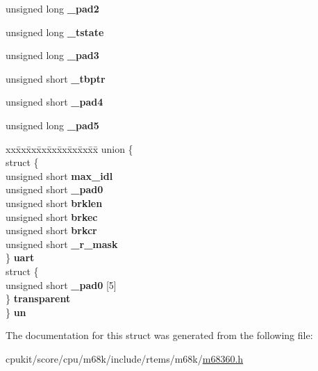 \begin{DoxyCompactItemize}
\mbox{\label{structm360SMCparms___a5f11a155ff3ae2e140478bc896fb7c73}} 
unsigned long {\bfseries \+\_\+pad2}
\item 
\mbox{\label{structm360SMCparms___a14de9c88df7ce54bcdd005c7e20d6cac}} 
unsigned long {\bfseries \+\_\+tstate}
\item 
\mbox{\label{structm360SMCparms___ad1c50a2648813585cfe1d586f0d2aab8}} 
unsigned long {\bfseries \+\_\+pad3}
\item 
\mbox{\label{structm360SMCparms___aca7fd379aaa1236a2b74e1fa799dba6d}} 
unsigned short {\bfseries \+\_\+tbptr}
\item 
\mbox{\label{structm360SMCparms___a2435a2ede810d0e026f723d1068fd534}} 
unsigned short {\bfseries \+\_\+pad4}
\item 
\mbox{\label{structm360SMCparms___a63d9540311b563bd5edf430e6be09aeb}} 
unsigned long {\bfseries \+\_\+pad5}
\item 
\mbox{\label{structm360SMCparms___a81d9fa8116d052eaafc039a211f5062a}} 
\begin{tabbing}
xx\=xx\=xx\=xx\=xx\=xx\=xx\=xx\=xx\=\kill
union \{\\
\>struct \{\\
\>\>unsigned short {\bfseries max\_idl}\\
\>\>unsigned short {\bfseries \_pad0}\\
\>\>unsigned short {\bfseries brklen}\\
\>\>unsigned short {\bfseries brkec}\\
\>\>unsigned short {\bfseries brkcr}\\
\>\>unsigned short {\bfseries \_r\_mask}\\
\>\} {\bfseries uart}\\
\>struct \{\\
\>\>unsigned short {\bfseries \_pad0} \mbox{[}5\mbox{]}\\
\>\} {\bfseries transparent}\\
\} {\bfseries un}\\

\end{tabbing}\end{DoxyCompactItemize}


The documentation for this struct was generated from the following file\+:\begin{DoxyCompactItemize}
\item 
cpukit/score/cpu/m68k/include/rtems/m68k/\mbox{\hyperlink{m68360_8h}{m68360.\+h}}\end{DoxyCompactItemize}
